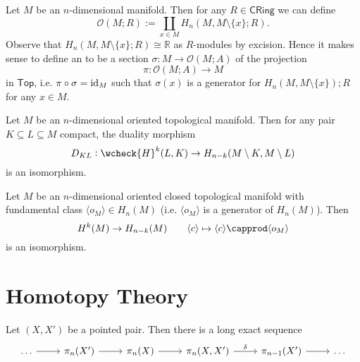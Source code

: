 Let $M$ be an $n$-dimensional manifold. Then for any $R \in \mathsf{CRing}$ we can define
\begin{equation*}
	\mathcal{O}(M;R) := \coprod_{x \in M}H_n(M,M\setminus \{x\};R).
\end{equation*}
Observe that $H_n(M,M\setminus \{x\};R) \cong \mathbb{R}$ as $R$-modules by excision. Hence it makes sense to define an  to be a section $\sigma : M \to \mathcal{O}(M;A)$ of the projection
\begin{equation*}
	\pi : \mathcal{O}(M;A) \to M
\end{equation*}
\noindent in $\mathsf{Top}$, i.e. $\pi \circ \sigma = \operatorname{id}_M$ such that $\sigma(x)$ is a generator for $H_n(M,M\setminus \{x\});R$ for any $x \in M$.

\begin{theorem}
	Let $M$ be an $n$-dimensional oriented topological manifold. Then for any pair $K \subseteq L \subseteq M$ compact, the duality morphism
	\begin{equation*}
		D_{KL} : \wcheck{H}^k(L,K) \to H_{n - k}(M \setminus K,M \setminus L)
	\end{equation*}
	\noindent is an isomorphism.
\end{theorem}

\begin{corollary}
	Let $M$ be an $n$-dimensional oriented closed topological manifold with fundamental class $\langle o_M \rangle \in H_n(M)$ (i.e. $\langle o_M \rangle$ is a generator of $H_n(M)$). Then
	\begin{equation*}
		H^k(M) \to H_{n - k}(M) \qquad \langle c \rangle \mapsto \langle c \rangle \capprod \langle o_M \rangle
	\end{equation*}
	\noindent is an isomorphism.
\end{corollary}

\section*{Homotopy Theory}

\begin{theorem}
	\label{thm:LES}
	Let $(X,X')$ be a pointed pair. Then there is a long exact sequence
	\begin{equation*}
		\begin{tikzcd}
			\dots \arrow[r] & \pi_n(X') \arrow[r] & \pi_n(X) \arrow[r] & \pi_n(X,X') \arrow[r,"\delta"] & \pi_{n - 1}(X') \arrow[r] & \dots
		\end{tikzcd}
	\end{equation*}
\end{theorem}

